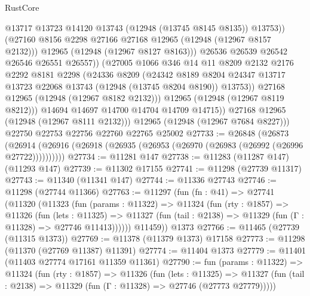 \begin{lexlean}{RustCore}
\begin{coremodule}
                        @13717
                        @13723
                        @14120
                        @13743
                        (@12948 (@13745 @8145 @8135))
                        @13753))
                    (@27160 @8156 @2298 @27166 @27168 @12965 (@12948 (@12967 @8157 @2132)))
                    @12965
                    (@12948 (@12967 @8127 @8163)))
                  @26536
                  @26539
                  @26542
                  @26546
                  @26551
                  @26557))
              (@27005
                @1066
                @346
                @14
                @11
                @8209
                @2132
                @2176
                @2292
                @8181
                @2298
                (@24336
                  @8209
                  (@24342
                    @8189
                    @8204
                    @24347
                    @13717
                    @13723
                    @22068
                    @13743
                    (@12948 (@13745 @8204 @8190))
                    @13753))
                @27168
                @12965
                (@12948 (@12967 @8182 @2132)))
              @12965
              (@12948 (@12967 @8119 @8212)))
            @14694
            @14697
            @14700
            @14704
            @14709
            @14715))
        @27168
        @12965
        (@12948 (@12967 @8111 @2132)))
      @12965
      (@12948 (@12967 @7684 @8227)))
    @22750
    @22753
    @22756
    @22760
    @22765
    @25002
@27733 := @26848
    (@26873 (@26914 (@26916 (@26918 (@26935 (@26953 (@26970 (@26983 (@26992 (@26996 @27722))))))))))
@27734 := @11281 @147
@27738 := @11283 (@11287 @147) (@11293 @147)
@27739 := @11302 @17155
@27741 := @11298 (@27739 @11317)
@27743 := @11340 (@11341 @147)
@27744 := @11336 @27743
@27746 := @11298 (@27744 @11366)
@27763 := @11297
    (fun (fn : @41) =>
    @27741
      (@11320
        (@11323
          (fun (params : @11322) =>
          @11324
            (fun (rty : @1857) =>
            @11326
              (fun (lets : @11325) =>
              @11327 (fun (tail : @2138) => @11329 (fun (Γ : @11328) => @27746 @11413))))))
        @11459))
    @1373
@27766 := @11465 (@27739 (@11315 @1373))
@27769 := @11378 (@11379 @1373) @17158
@27773 := @11298 (@11370 (@27769 @11387) @11391)
@27774 := @11404 @1373
@27779 := @11401 (@11403 @27774 @17161 @11359 @11361)
@27790 := fun (params : @11322) =>
  @11324
    (fun (rty : @1857) =>
    @11326
      (fun (lets : @11325) =>
      @11327 (fun (tail : @2138) => @11329 (fun (Γ : @11328) => @27746 (@27773 @27779)))))

\end{coremodule}
\end{lexlean}
